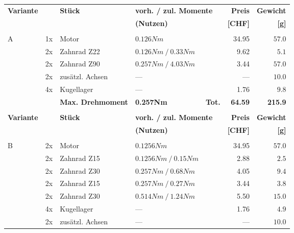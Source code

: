 \begin{longtable}{p{0.5cm}p{0.8cm}lp{3cm}p{0.5cm}rr} 
    \textbf{Variante}& & \textbf{Stück} & \multicolumn{2}{p{3.7cm}}{\textbf{vorh. / zul. Momente}} &
    \textbf{Preis} & \textbf{Gewicht} \\
    & & & \multicolumn{2}{p{3.7cm}}{\textbf{(Nutzen)}} & \textbf{[CHF]} & \textbf{[g]} \\\hline
      &       &                 &                      & &          &  \\
    \multirow{6}[2]{*}{A}
      & 1x    & Motor           & $0.126 Nm$           & & 34.95  & $57.0$ \\
      & 2x    & Zahnrad Z22     & $0.126 Nm~/~0.33 Nm$ & &  9.62  & $5.1$  \\
      & 2x    & Zahnrad Z90     & $0.257 Nm~/~4.03 Nm$ & &  3.44  & $57.0$ \\
      & 2x    & zusätzl. Achsen & {---}                & & {---}  & $10.0$ \\
      & 4x    & Kugellager      & {---}                & &  1.76  & $9.8$  \\
      &  &  \textbf{Max. Drehmoment} & \textbf{0.257Nm} & \textbf{Tot.}& \textbf{64.59} & \textbf{215.9} \\
      &       &                 &                      & &          &  \\
      \newpage
      \textbf{Variante}& & \textbf{Stück} & \multicolumn{2}{p{3.7cm}}{\textbf{vorh. / zul. Momente}} &
      \textbf{Preis} & \textbf{Gewicht} \\
      & & & \multicolumn{2}{p{3.7cm}}{\textbf{(Nutzen)}} & \textbf{[CHF]} & \textbf{[g]} \\\hline
        &       &                 &                      & &          &  \\
    \multirow{8}[2]{*}{B}
      & 2x    & Motor           & $0.1256 Nm$          & & 34.95  & $57.0$ \\
      & 2x    & Zahnrad Z15     & $0.1256 Nm~/~0.15 Nm$& & 2.88   & $2.5$  \\
      & 2x    & Zahnrad Z30     & $0.257 Nm~/~0.68 Nm$ & & 4.05   & $9.4$  \\
      & 2x    & Zahnrad Z15     & $0.257 Nm~/~0.27 Nm$ & & 3.44   & $3.8$  \\
      & 2x    & Zahnrad Z30     & $0.514 Nm~/~1.24 Nm$ & & 5.50   & $15.0$ \\
      & 4x    & Kugellager      & {---}                & & 1.76   & $4.9$  \\
      & 2x    & zusätzl. Achsen & {---}                & & {---}  & $10.0$ \\

\end{longtable}

